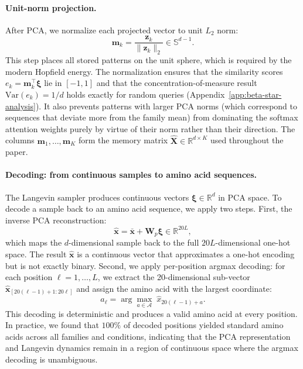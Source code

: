 \paragraph{Unit-norm projection.}
After PCA, we normalize each projected vector to unit $L_2$ norm:
\begin{equation}
    \mathbf{m}_k = \frac{\mathbf{z}_k}{\|\mathbf{z}_k\|_2} \in \mathbb{S}^{d-1}.
\end{equation}
This step places all stored patterns on the unit sphere, which is required by the modern Hopfield energy. The normalization ensures that the similarity scores $e_k = \mathbf{m}_k^\top\boldsymbol{\xi}$ lie in $[-1, 1]$ and that the concentration-of-measure result $\mathrm{Var}(e_k) = 1/d$ holds exactly for random queries (Appendix~\ref{app:beta-star-analysis}). It also prevents patterns with larger PCA norms (which correspond to sequences that deviate more from the family mean) from dominating the softmax attention weights purely by virtue of their norm rather than their direction. The columns $\mathbf{m}_1, \ldots, \mathbf{m}_K$ form the memory matrix $\hat{\mathbf{X}} \in \mathbb{R}^{d \times K}$ used throughout the paper.

\paragraph{Decoding: from continuous samples to amino acid sequences.}
The Langevin sampler produces continuous vectors $\boldsymbol{\xi} \in \mathbb{R}^d$ in PCA space. To decode a sample back to an amino acid sequence, we apply two steps. First, the inverse PCA reconstruction:
\begin{equation}
    \hat{\mathbf{x}} = \bar{\mathbf{x}} + \mathbf{W}_p\boldsymbol{\xi} \in \mathbb{R}^{20L},
\end{equation}
which maps the $d$-dimensional sample back to the full $20L$-dimensional one-hot space. The result $\hat{\mathbf{x}}$ is a continuous vector that approximates a one-hot encoding but is not exactly binary. Second, we apply per-position argmax decoding: for each position $\ell = 1, \ldots, L$, we extract the 20-dimensional sub-vector $\hat{\mathbf{x}}_{[20(\ell-1)+1 : 20\ell]}$ and assign the amino acid with the largest coordinate:
\begin{equation}
    a_\ell = \arg\max_{a \in \mathcal{A}}\; \hat{x}_{20(\ell-1) + a}.
\end{equation}
This decoding is deterministic and produces a valid amino acid at every position. In practice, we found that $100\%$ of decoded positions yielded standard amino acids across all families and conditions, indicating that the PCA representation and Langevin dynamics remain in a region of continuous space where the argmax decoding is unambiguous.

